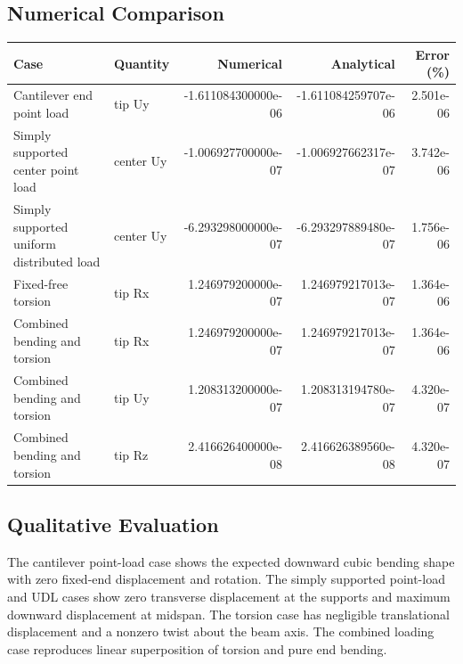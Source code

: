 \documentclass[11pt]{article}
\begin{document}
\subsection*{Numerical Comparison}
\begin{table}[h]
\centering
\scriptsize
\begin{tabular}{llrrr}
\hline
Case & Quantity & Numerical & Analytical & Error (\%) \\
\hline
Cantilever end point load & tip Uy & -1.611084300000e-06 & -1.611084259707e-06 & 2.501e-06 \\
Simply supported center point load & center Uy & -1.006927700000e-07 & -1.006927662317e-07 & 3.742e-06 \\
Simply supported uniform distributed load & center Uy & -6.293298000000e-07 & -6.293297889480e-07 & 1.756e-06 \\
Fixed-free torsion & tip Rx & 1.246979200000e-07 & 1.246979217013e-07 & 1.364e-06 \\
Combined bending and torsion & tip Rx & 1.246979200000e-07 & 1.246979217013e-07 & 1.364e-06 \\
Combined bending and torsion & tip Uy & 1.208313200000e-07 & 1.208313194780e-07 & 4.320e-07 \\
Combined bending and torsion & tip Rz & 2.416626400000e-08 & 2.416626389560e-08 & 4.320e-07 \\
\hline
\end{tabular}
\end{table}

\subsection*{Qualitative Evaluation}
The cantilever point-load case shows the expected downward cubic bending shape with zero fixed-end displacement and rotation.  The simply supported point-load and UDL cases show zero transverse displacement at the supports and maximum downward displacement at midspan.  The torsion case has negligible translational displacement and a nonzero twist about the beam axis.  The combined loading case reproduces linear superposition of torsion and pure end bending.
\end{document}
